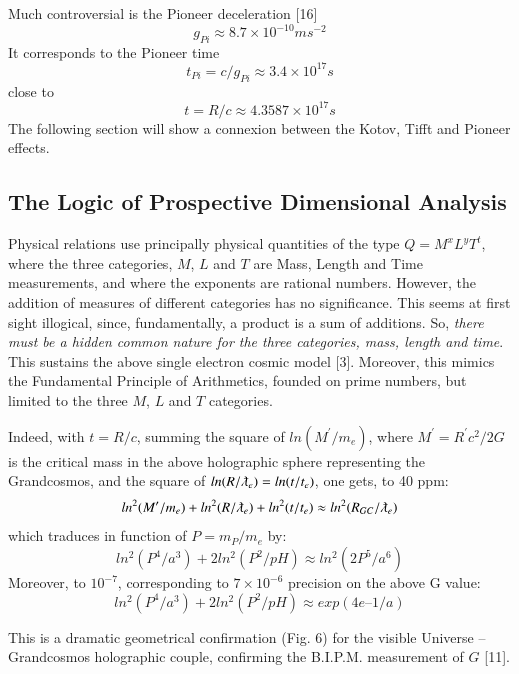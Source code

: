 \documentclass[twoside,draft]{article}
\begin{document}
\begin{sloppypar}
{Much controversial is the Pioneer deceleration [16] $$g_{Pi} \approx 8.7 \times 10^{-10} ms^{-2}$$ It corresponds to
the Pioneer time $$t_{Pi} = c/g_{Pi} \approx 3.4 \times 10^{17} s $$ close to $$t = R/c \approx 4.3587 \times 10^{17} s $$ The following section will show a connexion between the Kotov, Tifft and Pioneer effects.

\subsection{The Logic of Prospective Dimensional Analysis}

Physical relations use principally physical quantities of the type $Q = M^{x} L^{y} T^{t}$, where
the three categories, $M$, $L$ and $T$ are Mass, Length and Time measurements, and where the exponents are
rational numbers. However, the addition of measures of different categories has no significance.
This seems at first sight illogical, since, fundamentally, a product is a sum of additions. So, \textit{there
must be a hidden common nature for the three categories, mass, length and time}. This sustains the
above single electron cosmic model [3]. Moreover, this mimics the Fundamental Principle of
Arithmetics, founded on prime numbers, but limited to the three $M$, $L$ and $T$ categories. 

Indeed, with $t =
R/c$, summing the square of $ln(M^{\prime}/m_{e} )$, where $M^{\prime} = R^{\prime} c^{2} /2G$ is the critical mass in the above
holographic sphere representing the Grandcosmos, and the square of $ln(R/\lambdabar_{e} ) = ln(t/t_{e} )$, one gets, to 40 ppm:
\begin{equation}
ln^{2} (M^{\prime}/m_{e} ) + ln^{2} (R/\lambdabar_{e}) + ln^2 (t/t_{e} ) \approx ln^2 (R_{GC} /\lambdabar_{e} )
\end{equation} which traduces in function of $P = m_P/m_e$ by:
\begin{equation}
ln^2(P^4/a^3) + 2 ln^2(P^2/pH) \approx ln^2(2P^5/a^6)
\end{equation}
Moreover, to $10^{-7}$, corresponding to $7 \times 10^{-6}$ precision on the above G value:
\begin{equation}
ln^2(P^4/a^3) + 2 ln^2(P^2/pH) \approx exp(4e – 1/a)
\end{equation}
 
This is a dramatic geometrical confirmation (Fig. 6) for the visible Universe – Grandcosmos holographic couple, confirming the B.I.P.M. measurement of $G$ [11].


}
\end{sloppypar}
\end{document}
